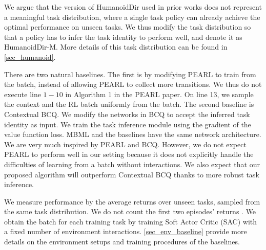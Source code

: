 We argue that the version of HumanoidDir used in prior works does not represent a meaningful task distribution, where a single task policy can already achieve the optimal performance on unseen tasks. We thus modify the task distribution so that a policy has to infer the task identity to perform well, and denote it as HumanoidDir-M. More details of this task distribution can be found in \autoref{sec_humanoid}.

There are two natural baselines. The first is by modifying PEARL \cite{rakelly2019efficient} to train from the batch, instead of allowing PEARL to collect more transitions. We thus do not execute line $1-10$ in Algorithm 1 in the PEARL paper. On line 13, we sample the context and the RL batch uniformly from the batch. The second baseline is Contextual BCQ. We modify the networks in BCQ to accept the inferred task identity as input. We train the task inference module using the gradient of the value function loss. MBML and the baselines have the same network architecture. We are very much inspired by PEARL and BCQ. However, we do not expect PEARL to perform well in our setting because it does not explicitly handle the difficulties of learning from a batch without interactions. We also expect that our proposed algorithm will outperform Contextual BCQ thanks to more robust task inference.

We measure performance by the average returns over unseen tasks, sampled from the same task distribution. We do not count the first two episodes' returns \cite{rakelly2019efficient}. We obtain the batch for each training task by training Soft Actor Critic (SAC) \cite{haarnoja2018soft} with a fixed number of environment interactions. \autoref{sec_env_baseline} provide more details on the environment setups and training procedures of the baselines.

